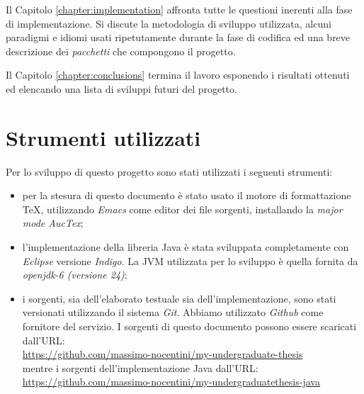 Il Capitolo \ref{chapter:implementation} affronta tutte le questioni
inerenti alla fase di implementazione. Si discute la metodologia di
sviluppo utilizzata, alcuni paradigmi e idiomi usati ripetutamente
durante la fase di codifica ed una breve descrizione dei
\emph{pacchetti} che compongono il progetto.

Il Capitolo \ref{chapter:conclusions} termina il lavoro esponendo i
risultati ottenuti ed elencando una lista di sviluppi futuri del
progetto.

\section{Strumenti utilizzati}
Per lo sviluppo di questo progetto sono stati utilizzati i seguenti
strumenti:
\begin{itemize}
\item per la stesura di questo documento \`e stato usato il motore di
  formattazione \TeX, utilizzando \emph{Emacs} come editor dei file
  sorgenti, installando la \emph{major mode AucTex};
\item l'implementazione della libreria Java \`e stata sviluppata
  completamente con \emph{Eclipse} versione \emph{Indigo}. La JVM
  utilizzata per lo sviluppo \`e quella fornita da \emph{openjdk-6
    (versione 24)};
\item i sorgenti, sia dell'elaborato testuale sia
  dell'implementazione, sono stati versionati utilizzando il sistema
  \emph{Git}. Abbiamo utilizzato \emph{Github} come fornitore del
  servizio. I sorgenti di questo documento possono essere scaricati
  dall'URL:\\
  \href{https://github.com/massimo-nocentini/my-undergraduate-thesis}{
    https://github.com/massimo-nocentini/my-undergraduate-thesis}\\
  mentre i sorgenti dell'implementazione Java dall'URL:\\
  \href{https://github.com/massimo-nocentini/my-undergraduatethesis-java}{
    https://github.com/massimo-nocentini/my-undergraduatethesis-java}
\end{itemize}